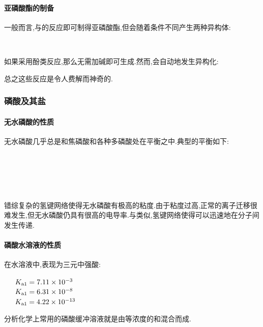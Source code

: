 \documentclass{ctexart}
\begin{document}
\paragraph{亚磷酸酯的制备}
一般而言,与的反应即可制得亚磷酸酯,但会随着条件不同产生两种异构体:
\begin{center}
    \\
\end{center}
如果采用酚类反应,那么无需加碱即可生成.然而,会自动地发生异构化:
\begin{center}
\end{center}
总之这些反应是令人费解而神奇的.
\subsubsection{磷酸及其盐}
\paragraph{无水磷酸的性质}
无水磷酸几乎总是和焦磷酸和各种多磷酸处在平衡之中.典型的平衡如下:
\begin{center}
    \\
    \\
    \\
    \\
\end{center}
错综复杂的氢键网络使得无水磷酸有极高的粘度.由于粘度过高,正常的离子迁移很难发生,但无水磷酸仍具有很高的电导率.与类似,氢键网络使得可以迅速地在分子间发生传递.
\paragraph{磷酸水溶液的性质}
在水溶液中,表现为三元中强酸:
\begin{center}
    \ \ \ $K_{\text a1}=7.11\times10^{-3}$\\
    \ \ \ $K_{\text a1}=6.31\times10^{-8}$\\
    \ \ \ $K_{\text a1}=4.22\times10^{-13}$
\end{center}
分析化学上常用的磷酸缓冲溶液就是由等浓度的和混合而成.
\end{document}
